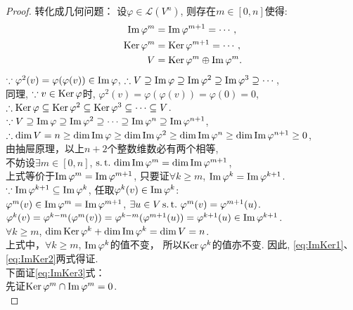 \begin{proof}
  转化成几何问题：
  设$\varphi \in \mathcal{L}(V^n)$, 则存在$m \in [0,n]$使得: 
  \begin{align}
    \operatorname{Im}\varphi^m &  = \operatorname{Im}\varphi^{m+1}=\cdots, \label{eq:ImKer1}\\
    \operatorname{Ker}\varphi^m & = \operatorname{Ker}\varphi^{m+1}=\cdots,\label{eq:ImKer2} \\
    V & = \operatorname{Ker}\varphi^m\oplus\operatorname{Im}\varphi^m.\label{eq:ImKer3}
  \end{align}
  $\because \varphi^2(v) = \varphi(\varphi(v)) \in \operatorname{Im}\varphi$, 
  $\therefore V \supseteq \operatorname{Im}\varphi \supseteq \operatorname{Im}\varphi^2
  \supseteq \operatorname{Im}\varphi^3 \supseteq \cdots$, \\
  同理, $\because v \in \operatorname{Ker}\varphi$时,
  $\varphi^2(v) = \varphi(\varphi(v))=\varphi(0) = 0$, \\
  $\therefore \operatorname{Ker}\varphi \subseteq \operatorname{Ker}\varphi^2
  \subseteq \operatorname{Ker}\varphi^3
  \subseteq \cdots \subseteq V$.\\
  $\because V \supseteq \operatorname{Im}\varphi \supseteq \operatorname{Im}\varphi^2
  \supseteq \cdots \supseteq \operatorname{Im}\varphi^n \supseteq \operatorname{Im}\varphi^{n+1}$, \\
  $\therefore \operatorname{dim} V = n \geq \operatorname{dim}\operatorname{Im}\varphi \geq \operatorname{dim}\operatorname{Im}\varphi^2
  \geq \operatorname{dim}\operatorname{Im}\varphi^n \geq \operatorname{dim}\operatorname{Im}\varphi^{n+1} \geq 0$, \\
  由抽屉原理，以上$n+2$个整数维数必有两个相等, \\
  不妨设$\exists m \in [0, n]$, $\operatorname{s.t.{}} \operatorname{dim}\operatorname{Im}\varphi^m = \operatorname{dim}\operatorname{Im}\varphi^{m+1}$, \\
  上式等价于$\operatorname{Im}\varphi^m = \operatorname{Im}\varphi^{m+1}$,
  只要证$\forall k \geq m$, $\operatorname{Im}\varphi^k = \operatorname{Im}\varphi^{k+1}$. \\
  $\because \operatorname{Im}\varphi^{k+1} \subseteq \operatorname{Im}\varphi^k$,
  任取$\varphi^k(v) \in \operatorname{Im}\varphi^k$: \\
  $\varphi^m(v) \in \operatorname{Im}\varphi^m = \operatorname{Im}\varphi^{m+1}$,
  $\exists u \in V \operatorname{s.t.{}} \varphi^m(v) = \varphi^{m+1}(u)$. \\
  $\varphi^k(v)= \varphi^{k-m}(\varphi^m(v)) =
  \varphi^{k-m}(\varphi^{m+1}(u)) = \varphi^{k+1}(u) \in \operatorname{Im}\varphi^{k+1}$. \\
  $\forall k \geq m$, $\operatorname{dim}\operatorname{Ker}\varphi^k + \operatorname{dim}\operatorname{Im}\varphi^k = \operatorname{dim} V = n$. \\
  上式中，$\forall k \geq m$, $\operatorname{Im}\varphi^k$的值不变，
  所以$\operatorname{Ker}\varphi^k$的值亦不变.
  因此, \ref{eq:ImKer1}、\ref{eq:ImKer2}两式得证. \\
  下面证\ref{eq:ImKer3}式： \\
  先证$\operatorname{Ker}\varphi^m \cap \operatorname{Im}\varphi^m=0$.\\

\end{proof}
